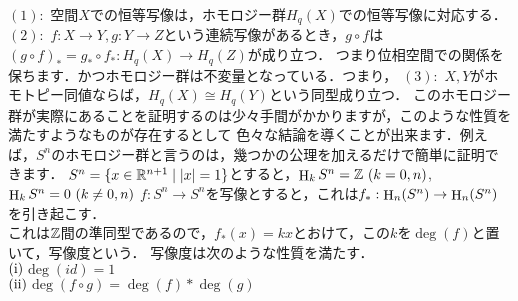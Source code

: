 $(1):$ 空間$X$での恒等写像は，ホモロジー群$H_q(X)$での恒等写像に対応する．\\
$(2):$ $f:X\to Y,g:Y\to Z$という連続写像があるとき，$g\circ f$は$(g\circ f)_* = g_* \circ f_* :H_q(X) \to H_q(Z)$が成り立つ．
つまり位相空間での関係を保ちます．かつホモロジー群は不変量となっている．つまり，
$(3):$ $X,Y$がホモトピー同値ならば，$H_q(X) \cong H_q(Y)$という同型成り立つ．
このホモロジー群が実際にあることを証明するのは少々手間がかかりますが，このような性質を満たすようなものが存在するとして
色々な結論を導くことが出来ます．例えば，$S^n$のホモロジー群と言うのは，幾つかの公理を加えるだけで簡単に証明できます．
\thm
$S^n=\{x\in\mathbb R^{n+1} \mid |x|=1\}$とすると，$\mathop{\mathrm{H}}\nolimits_k S^n = \mathbb Z\  (k=0,n)$,$\mathop{\mathrm{H}}\nolimits_k S^n = 0\  (k\neq 0,n)$
\thmx
\thm
$f:S^n \to S^n$を写像とすると，これは$f_*:\mathop{\mathrm{H}}\nolimits_n(S^n)\to \mathop{\mathrm{H}}\nolimits_n(S^n)$を引き起こす．\\
これは$\mathbb Z$間の準同型であるので，$f_*(x) = kx$とおけて，この$k$を$\deg(f)$と置いて，写像度という．
\thmx
\prop
写像度は次のような性質を満たす．\\
$\rm (i)$$\deg(id)=1$\\
$\rm (ii)$$\deg(f\circ g) = \deg(f)*\deg(g)$\\
